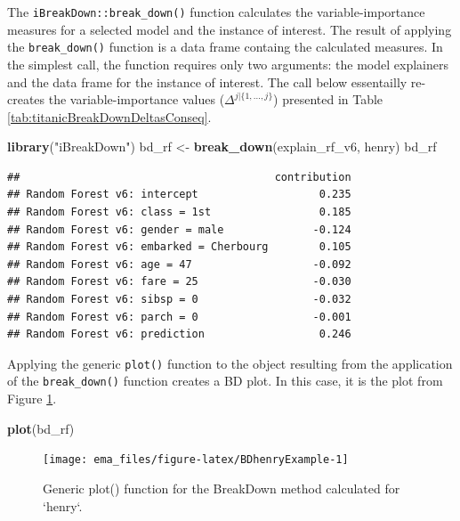 \documentclass[12pt,]{krantz}
\newenvironment{Shaded}{\begin{snugshade}}{\end{snugshade}}
\newcommand{\KeywordTok}[1]{\textcolor[rgb]{0.13,0.29,0.53}{\textbf{#1}}}
\newcommand{\NormalTok}[1]{#1}
\newcommand{\StringTok}[1]{\textcolor[rgb]{0.31,0.60,0.02}{#1}}
\begin{document}
The \texttt{iBreakDown::break\_down()} function calculates the variable-importance measures for a selected model and the instance of interest. The result of applying the \texttt{break\_down()} function is a data frame containg the calculated measures. In the simplest call, the function requires only two arguments: the model explainers and the data frame for the instance of interest. The call below essentailly re-creates the variable-importance values (\(\Delta^{j|\{1,\ldots,j\}}\)) presented in Table \ref{tab:titanicBreakDownDeltasConseq}.

\begin{Shaded}
\begin{Highlighting}[]
\KeywordTok{library}\NormalTok{(}\StringTok{"iBreakDown"}\NormalTok{)}
\NormalTok{bd_rf <-}\StringTok{ }\KeywordTok{break_down}\NormalTok{(explain_rf_v6, henry)}
\NormalTok{bd_rf}
\end{Highlighting}
\end{Shaded}

\begin{verbatim}
##                                        contribution
## Random Forest v6: intercept                   0.235
## Random Forest v6: class = 1st                 0.185
## Random Forest v6: gender = male              -0.124
## Random Forest v6: embarked = Cherbourg        0.105
## Random Forest v6: age = 47                   -0.092
## Random Forest v6: fare = 25                  -0.030
## Random Forest v6: sibsp = 0                  -0.032
## Random Forest v6: parch = 0                  -0.001
## Random Forest v6: prediction                  0.246
\end{verbatim}

Applying the generic \texttt{plot()} function to the object resulting from the application of the \texttt{break\_down()} function creates a BD plot. In this case, it is the plot from Figure \ref{fig:BDhenryExample}.

\begin{Shaded}
\begin{Highlighting}[]
\KeywordTok{plot}\NormalTok{(bd_rf) }
\end{Highlighting}
\end{Shaded}

\begin{figure}

{\centering \texttt{[image: ema\_files/figure-latex/BDhenryExample-1]} 

}

\caption{Generic plot() function for the BreakDown method calculated for `henry`.}\label{fig:BDhenryExample}
\end{figure}
\end{document}
